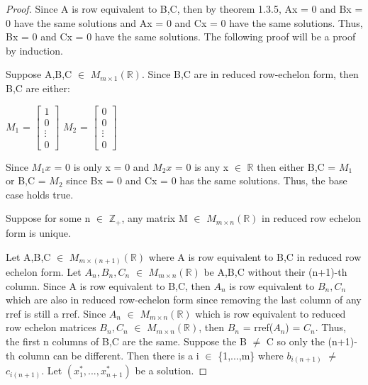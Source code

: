     \begin{proof}
        Since A is row equivalent to B,C, then by {\color{red} theorem 1.3.5},
        Ax = 0 and Bx = 0 have the same solutions and
        Ax = 0 and Cx = 0 have the same solutions. Thus,
        Bx = 0 and Cx = 0 have the same solutions.
        The following proof will be a proof by induction.

        Suppose A,B,C $\in$ $M_{m \times 1}(\mathbb{R})$.
        Since B,C are in reduced row-echelon form, then B,C are either:

        \hspace{0.5cm}
        \footnotesize
        $M_1$ =
        $\begin{bmatrix}
            1 \\
            0 \\
            \vdots \\
            0
        \end{bmatrix}$
        \hspace{0.5cm}
        $M_2$ =
        $\begin{bmatrix}
            0 \\
            0 \\
            \vdots \\
            0
        \end{bmatrix}$

        \normalsize
        Since $M_1x$ = 0 is only x = 0 and
        $M_2x$ = 0 is any x $\in$ $\mathbb{R}$
        then either B,C = $M_1$ or B,C = $M_2$
        since Bx = 0 and Cx = 0 has the same solutions.
        Thus, the base case holds true.

        Suppose for some n $\in$ $\mathbb{Z_+}$,
        any matrix M $\in$ $M_{m \times n}(\mathbb{R})$
        in reduced row echelon form is unique.

        Let A,B,C $\in$ $M_{m \times (n+1)}(\mathbb{R})$
        where A is row equivalent to B,C in reduced row echelon form.
        Let $A_n,B_n,C_n$ $\in$ $M_{m \times n}(\mathbb{R})$
        be A,B,C without their (n+1)-th column.
        Since A is row equivalent to B,C, then $A_n$ is row equivalent
        to $B_n,C_n$ which are also in reduced row-echelon form since
        removing the last column of any rref is still a rref.
        Since $A_n$ $\in$ $M_{m \times n}(\mathbb{R})$
        which is row equivalent to
        reduced row echelon matrices $B_n,C_n$ $\in$ $M_{m \times n}(\mathbb{R})$,
        then $B_n$ = rref($A_n$) = $C_n$.
        Thus, the first n columns of B,C are the same.
        Suppose the B $\not =$ C so only the (n+1)-th column can be different.
        Then there is a i $\in$ \{1,...,m\} where
        $b_{i(n+1)}$ $\not =$ $c_{i(n+1)}$.
        Let $(x_1^*,...,x_{n+1}^*)$ be a solution.


\end{proof}
